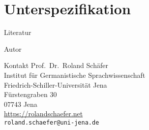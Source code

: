 \documentclass[handout,aspectratio=1610,dvipsnames]{beamer}
\begin{document}
  \section{Unterspezifikation}
  \let\woopsi\section\let\section\subsection\let\subsection\subsubsection
  
  \let\subsection\section\let\section\woopsi

\fi


\makeatletter
\setcounter{lastpagemainpart}{\the\c@framenumber}
\makeatother

\appendix

\begin{frame}[allowframebreaks]
  {Literatur}
  \renewcommand*{\bibfont}{\footnotesize}
  \printbibliography
\end{frame}

\begin{frame}
  {Autor}
  \begin{block}{Kontakt}
    Prof.\ Dr.\ Roland Schäfer\\
    Institut für Germanistische Sprachwissenschaft\\
    Friedrich-Schiller-Universität Jena\\
    Fürstengraben 30\\
    07743 Jena\\[\baselineskip]
    \url{https://rolandschaefer.net}\\
    \texttt{roland.schaefer@uni-jena.de}
  \end{block}
\end{frame}
\end{document}
